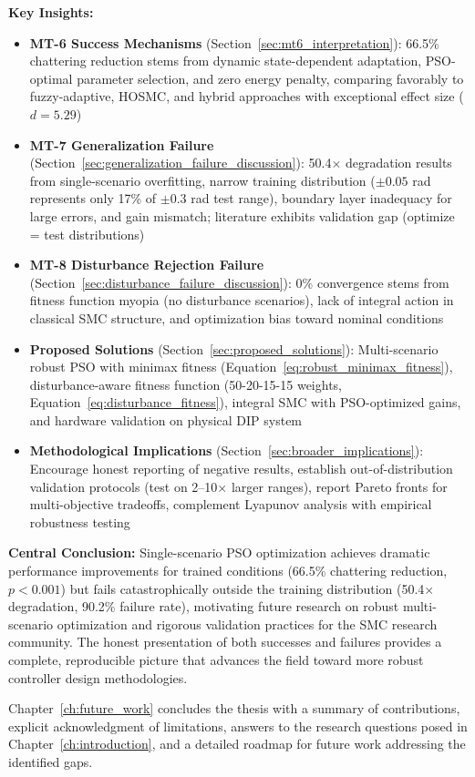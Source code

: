\textbf{Key Insights:}
\begin{itemize}
    \item \textbf{MT-6 Success Mechanisms} (Section~\ref{sec:mt6_interpretation}): 66.5\% chattering reduction stems from dynamic state-dependent adaptation, PSO-optimal parameter selection, and zero energy penalty, comparing favorably to fuzzy-adaptive, HOSMC, and hybrid approaches with exceptional effect size ($d = 5.29$)

    \item \textbf{MT-7 Generalization Failure} (Section~\ref{sec:generalization_failure_discussion}): 50.4$\times$ degradation results from single-scenario overfitting, narrow training distribution ($\pm 0.05$ rad represents only 17\% of $\pm 0.3$ rad test range), boundary layer inadequacy for large errors, and gain mismatch; literature exhibits validation gap (optimize = test distributions)

    \item \textbf{MT-8 Disturbance Rejection Failure} (Section~\ref{sec:disturbance_failure_discussion}): 0\% convergence stems from fitness function myopia (no disturbance scenarios), lack of integral action in classical SMC structure, and optimization bias toward nominal conditions

    \item \textbf{Proposed Solutions} (Section~\ref{sec:proposed_solutions}): Multi-scenario robust PSO with minimax fitness (Equation~\ref{eq:robust_minimax_fitness}), disturbance-aware fitness function (50-20-15-15 weights, Equation~\ref{eq:disturbance_fitness}), integral SMC with PSO-optimized gains, and hardware validation on physical DIP system

    \item \textbf{Methodological Implications} (Section~\ref{sec:broader_implications}): Encourage honest reporting of negative results, establish out-of-distribution validation protocols (test on 2--10$\times$ larger ranges), report Pareto fronts for multi-objective tradeoffs, complement Lyapunov analysis with empirical robustness testing
\end{itemize}

\textbf{Central Conclusion:} Single-scenario PSO optimization achieves dramatic performance improvements for trained conditions (66.5\% chattering reduction, $p < 0.001$) but fails catastrophically outside the training distribution (50.4$\times$ degradation, 90.2\% failure rate), motivating future research on robust multi-scenario optimization and rigorous validation practices for the SMC research community. The honest presentation of both successes and failures provides a complete, reproducible picture that advances the field toward more robust controller design methodologies.

Chapter~\ref{ch:future_work} concludes the thesis with a summary of contributions, explicit acknowledgment of limitations, answers to the research questions posed in Chapter~\ref{ch:introduction}, and a detailed roadmap for future work addressing the identified gaps.

